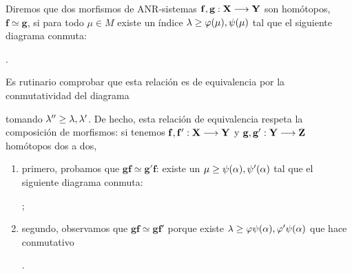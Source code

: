 Diremos que dos morfismos de ANR-sistemas $ \mathbf{f},\mathbf{g}:\mathbf{X}\longrightarrow \mathbf{Y} $ son homótopos, $ \mathbf{f}\simeq \mathbf{g} $, si para todo $ \mu\in M  $ existe un índice $ \lambda\geq \varphi(\mu),\psi(\mu ) $ tal que el siguiente  diagrama conmuta:
\begin{center}
  .
\end{center}
Es rutinario comprobar que esta relación es de equivalencia por la conmutatividad del diagrama 
\begin{center}
\end{center}
tomando $ \lambda'' \geq \lambda,\lambda'  $. De hecho, esta relación de equivalencia respeta la composición de morfismos: si tenemos $ \mathbf{f},\mathbf{f}':\mathbf{X}\longrightarrow \mathbf{Y} $ y $ \mathbf{g},\mathbf{g}':\mathbf{Y}\longrightarrow \mathbf{Z } $ homótopos dos a dos, 
\begin{enumerate}
  \item primero, probamos que $ \mathbf{g}\mathbf{f}\simeq \mathbf{g}'\mathbf{f} $: existe un $ \mu\geq \psi(\alpha),\psi'(\alpha) $ tal que el siguiente diagrama conmuta:
  \begin{center}
    ;
  \end{center}
  \item segundo, observamos que $ \mathbf{g}\mathbf{f}\simeq \mathbf{g}\mathbf{f}'  $ porque existe $ \lambda\geq \varphi\psi(\alpha),\varphi'\psi(\alpha) $ que hace conmutativo
  \begin{center}
  \end{center}.
\end{enumerate}
